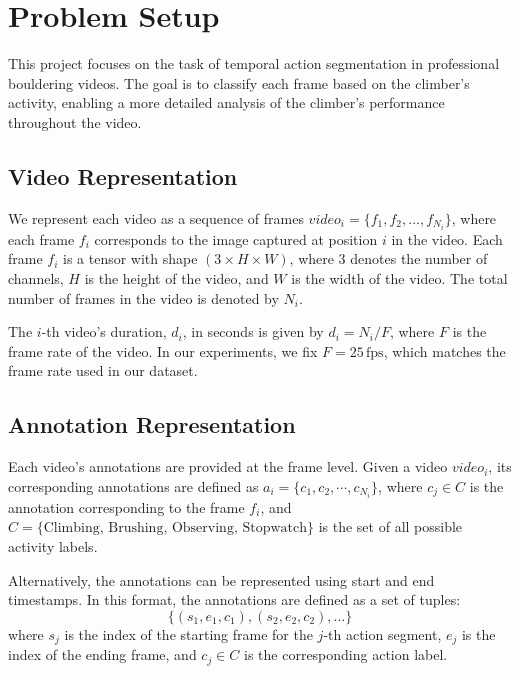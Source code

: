 \section{Problem Setup}

\begin{tcolorbox}[colback=lightgray!10, colframe=black, title={Research Aim}]
    This project focuses on the task of temporal action segmentation in professional bouldering videos. The goal is to classify each frame based on the climber's activity, enabling a more detailed analysis of the climber's performance throughout the video.
\end{tcolorbox}

\subsection{Video Representation}
We represent each video as a sequence of frames $video_i = \{f_1, f_2, \dots, f_{N_i}\}$, where each frame $f_i$ corresponds to the image captured at position $i$ in the video. Each frame $f_i$ is a tensor with shape $(3 \times H \times W)$, where $3$ denotes the number of channels, $H$ is the height of the video, and $W$ is the width of the video. The total number of frames in the video is denoted by $N_i$.

The $i$-th video's duration, $d_i$, in seconds is given by $d_i = N_i / F$, where $F$ is the frame rate of the video. In our experiments, we fix $F = 25 \, \text{fps}$, which matches the frame rate used in our dataset.

\subsection{Annotation Representation}  
Each video's annotations are provided at the frame level. Given a video $video_i$, its corresponding annotations are defined as $a_i = \{c_1, c_2, \cdots, c_{N_i}\}$, where $c_j \in C$ is the annotation corresponding to the frame $f_i$, and $C = \{\text{Climbing, Brushing, Observing, Stopwatch}\}$ is the set of all possible activity labels.

Alternatively, the annotations can be represented using start and end timestamps. In this format, the annotations are defined as a set of tuples:  
\[
\{(s_1, e_1, c_1), (s_2, e_2, c_2), \dots \}
\]  
where $s_j$ is the index of the starting frame for the $j$-th action segment, $e_j$ is the index of the ending frame, and $c_j \in C$ is the corresponding action label.

